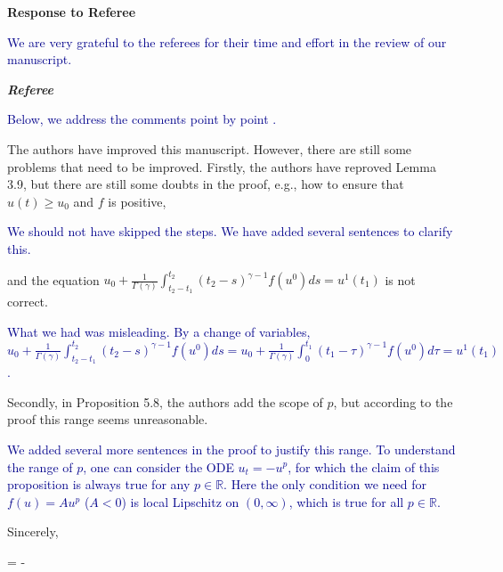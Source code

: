 \documentclass[11pt]{letter}
\newcommand\tcb{\textcolor{DarkBlue}}
\begin{document}
\signature{Yuanyuan Feng,\\Lei Li, \\ Jian-Guo Liu, \\ Xiaoqian Xu}

\date{\hfill}
\longindentation=0pt                       %
 
\begin{letter}{
}

\opening{\vspace{-.7in}
{\Large \textbf{Response to Referee}}}
\vspace{.2in}

\tcb{We are very grateful to the referees for their time and effort in the review of our manuscript. }

\textit{\textbf{Referee}}

\tcb{Below, we address the comments point by point .}

The authors have improved this manuscript. However, there are still
some problems that need to be improved. Firstly, the authors have reproved Lemma 3.9, but there are still some doubts in the proof, e.g., how to ensure that $u(t)\ge u_0$ and $f$ is positive,

\tcb{We should not have skipped the steps. We have added several sentences to clarify this. }

 and the equation $u_0+\frac{1}{\Gamma(\gamma)}\int_{t_2-t_1}^{t_2}(t_2-s)^{\gamma-1}f(u^0)ds=u^1(t_1)$ is not correct. 
 
 \tcb{What we had was misleading. By a change of variables, $u_0+\frac{1}{\Gamma(\gamma)}\int_{t_2-t_1}^{t_2}(t_2-s)^{\gamma-1}f(u^0)ds=u_0+\frac{1}{\Gamma(\gamma)}\int_0^{t_1}(t_1-\tau)^{\gamma-1}f(u^0)d\tau=u^1(t_1)$.}
 
 Secondly, in Proposition 5.8, the
authors add the scope of $p$, but according to the proof this range seems unreasonable.

\tcb{We added several more sentences in the proof to justify this range. To understand the range of $p$, one can consider the ODE $u_t=-u^p$, for which the claim of this proposition is always true for any $p\in \mathbb{R}$. Here the only condition we need for $f(u)=Au^p$ ($A<0$) is local Lipschitz on $(0,\infty)$, which is true for all $p\in\mathbb{R}$.}

\addtolength{\medskipamount}{-.8\medskipamount}
\closing{Sincerely,}

\newdimen\indentedwidth
\indentedwidth=\textwidth
\advance\indentedwidth -\longindentation

\end{letter}
\end{document}
